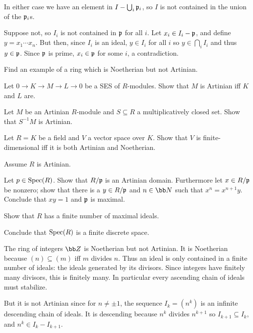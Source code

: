    In either case we have an element in $I-\bigcup_i{{\frak p}}_i$, so $I$ is not contained in the union of the ${{\frak p}}_i$s.

    \item Suppose not, so $I_i$ is not contained in ${{\frak p}}$ for all $i$.
    Let $x_i\in I_i-{{\frak p}}$, and define $y=x_1\cdots x_n$.
    But then, since $I_i$ is an ideal, $y\in I_i$ for all $i$ so $y\in\bigcap_iI_i$ and thus $y\in{{\frak p}}$.
    Since ${{\frak p}}$ is prime, $x_i\in{{\frak p}}$ for some $i$, a contradiction.
\eenum

\bprob

    \benum
        \item Find an example of a ring which is Noetherian but not Artinian.
        \item Let $0\to K\to M\to L\to0$ be a SES of $R$-modules.
        Show that $M$ is Artinian iff $K$ and $L$ are.
        \item Let $M$ be an Artinian $R$-module and $S\subseteq R$ a multiplicatively closed set.
        Show that $S^{-1}M$ is Artinian.
        \item Let $R=K$ be a field and $V$ a vector space over $K$.
        Show that $V$ is finite-dimensional iff it is both Artinian and Noetherian.
        \item Assume $R$ is Artinian.
        \benum
            \item Let $p\in{\rm Spec}(R)$.
            Show that $R/{{\frak p}}$ is an Artinian domain.
            Furthermore let $x\in R/{{\frak p}}$ be nonzero; show that there is a $y\in R/{{\frak p}}$ and $n\in\bN$ such that
            $x^n=x^{n+1}y$.
            Conclude that $xy=1$ and ${{\frak p}}$ is maximal.
            \item Show that $R$ has a finite number of maximal ideals.
            \item Conclude that ${\rm Spec}(R)$ is a finite discrete space.
        \eenum
    \eenum

\eprob

\benum
    \item The ring of integers $\bZ$ is Noetherian but not Artinian.
    It is Noetherian because $(n)\subseteq(m)$ iff $m$ divides $n$.
    Thus an ideal is only contained in a finite number of ideals: the ideals generated by its divisors.
    Since integers have finitely many divisors, this is finitely many.
    In particular every ascending chain of ideals must stabilize.

    But it is not Artinian since for $n\neq\pm1$, the sequence $I_k=(n^k)$ is an infinite descending chain of ideals.
    It is descending because $n^k$ divides $n^{k+1}$ so $I_{k+1}\subseteq I_k$, and $n^k\in I_k-I_{k+1}$.

